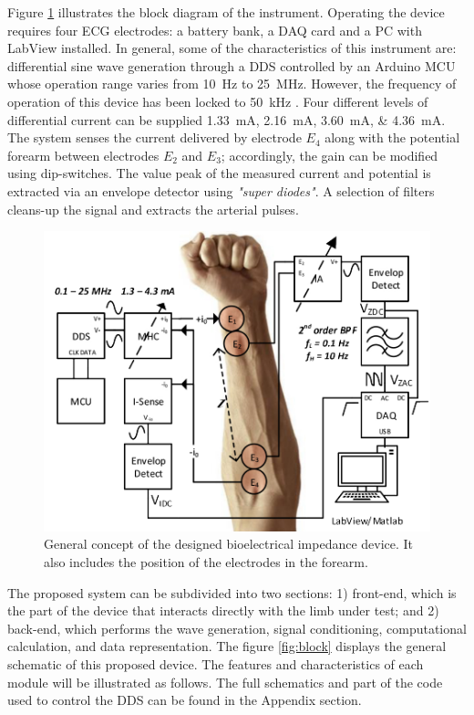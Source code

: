 Figure \ref{fig:electrode} illustrates the block diagram of the instrument. Operating the device requires four ECG electrodes: a battery bank, a DAQ card and a PC with LabView \cite{LabView:2016} installed. In general, some of the characteristics of this instrument are: differential sine wave generation through a DDS controlled by an Arduino MCU whose operation range varies from \SI{10}{\Hz} to \SI{25}{\MHz}. However, the frequency of operation of this device has been locked to \SI{50}{\kHz} . Four different levels of differential current can be supplied \SIlist{1.33;2.16;3.60;4.36}{\mA}. The system senses the current delivered by electrode $E_4$ along with the potential forearm between electrodes $E_2$ and $E_3$; accordingly, the gain can be modified using dip-switches. The value peak of the measured current and potential is extracted via an envelope detector using \textit{"super diodes"}. A selection of filters cleans-up the signal and extracts the arterial pulses.

\begin{figure}[!htpb]
	\centering
	\includegraphics[width=12cm,keepaspectratio]{figure1}	
	\caption[General concept of the designed bioelectrical impedance device]{General concept of the designed bioelectrical impedance device. It also includes the position of the electrodes in the forearm.}
	\label{fig:electrode}
\end{figure}

The proposed system can be subdivided into two sections: 1) front-end, which is the part of the device that interacts directly with the limb under test; and 2) back-end, which performs the wave generation, signal conditioning, computational calculation, and data representation. The figure \ref{fig:block} displays the general schematic of this proposed device. The features and characteristics of each module will be illustrated as follows. The full schematics and part of the code used to control the DDS can be found in the Appendix section.


